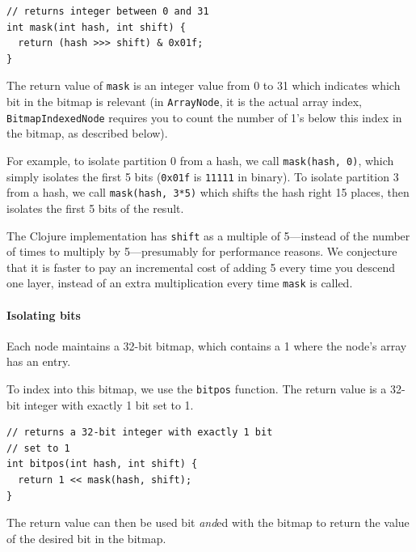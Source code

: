 \documentclass[preprint]{sigplanconf}
\begin{document}
\begin{verbatim}
// returns integer between 0 and 31
int mask(int hash, int shift) {
  return (hash >>> shift) & 0x01f;
}
\end{verbatim}

The return value of \texttt{mask}
is an integer value from 0 to 31
which indicates which bit in the bitmap
is relevant (in \texttt{ArrayNode},
it is the actual array index,
\texttt{BitmapIndexedNode}
requires you to count the number of
1's below this index in the bitmap,
as described below).

For example,
to isolate partition 0 from a hash,
we call
\texttt{mask(hash, 0)},
which simply isolates the first 5 bits
(\texttt{0x01f} is
\texttt{11111} in binary).
To isolate partition 3 from a hash,
we call
\texttt{mask(hash, 3*5)} which shifts
the hash right 15 places, then isolates
the first 5 bits of the result.

The Clojure implementation has
\texttt{shift} as a multiple of 5---instead
of the number of times to multiply by 5---presumably 
for performance reasons.
We conjecture that it is faster
to pay an incremental cost of
adding 5 every time you descend one layer,
instead of an extra multiplication every
time \texttt{mask} is called.

\paragraph{Isolating bits}

Each node maintains a 32-bit bitmap, which
contains a 1 where the node's array has
an entry.

To index into this bitmap, we use
the \texttt{bitpos} function.
The return value is a 32-bit integer
with exactly 1 bit set to 1. 

%

\begin{verbatim}
// returns a 32-bit integer with exactly 1 bit 
// set to 1
int bitpos(int hash, int shift) {
  return 1 << mask(hash, shift);
}
\end{verbatim}


The return value can then 
be used bit \textit{and}ed
with the bitmap to return the value of the
desired bit in the bitmap.
\end{document}
